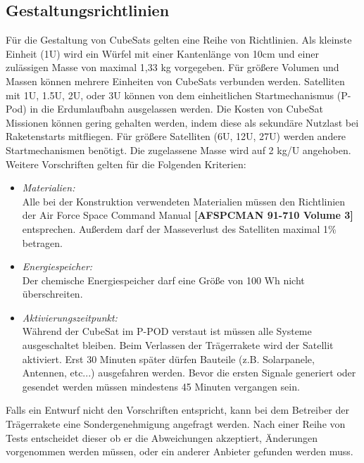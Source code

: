 	\subsection{Gestaltungsrichtlinien}%
Für die Gestaltung von CubeSats gelten eine Reihe von Richtlinien. Als kleinste Einheit (1U) wird ein Würfel mit einer Kantenlänge von 10cm und einer zulässigen Masse von maximal 1,33 kg vorgegeben. Für größere Volumen und Massen können mehrere Einheiten von CubeSats verbunden werden. Satelliten mit 1U, 1.5U, 2U, oder 3U können von dem einheitlichen Startmechanismus (P-Pod) in die Erdumlaufbahn ausgelassen werden. Die Kosten von CubeSat Missionen können gering gehalten werden, indem diese als sekundäre Nutzlast bei Raketenstarts mitfliegen. Für größere Satelliten (6U, 12U, 27U) werden andere Startmechanismen benötigt. Die zugelassene Masse wird auf 2 kg/U angehoben. Weitere Vorschriften gelten für die Folgenden Kriterien:
		\begin{itemize}
			\item \textit{Materialien:} 	\\ Alle bei der Konstruktion verwendeten Materialien müssen den Richtlinien der Air Force Space Command Manual \textbf{[AFSPCMAN 91-710 Volume 3]} entsprechen. Außerdem darf der Masseverlust des Satelliten maximal 1\% betragen.
			\item \textit{Energiespeicher:} \\ Der chemische Energiespeicher darf eine Größe von 100 Wh nicht überschreiten. 
			\item \textit{Aktivierungszeitpunkt:} \\ Während der CubeSat im P-POD verstaut ist müssen alle Systeme ausgeschaltet bleiben. Beim Verlassen der Trägerrakete wird der Satellit aktiviert. Erst 30 Minuten später dürfen Bauteile (z.B. Solarpanele, Antennen, etc...) ausgefahren werden. Bevor die ersten Signale generiert oder gesendet werden müssen mindestens 45 Minuten vergangen sein. 
		\end{itemize}
Falls ein Entwurf nicht den Vorschriften entspricht, kann bei dem Betreiber der Trägerrakete eine Sondergenehmigung angefragt werden. Nach einer Reihe von Tests entscheidet dieser ob er die Abweichungen akzeptiert, Änderungen vorgenommen werden müssen, oder ein anderer Anbieter gefunden werden muss. 

